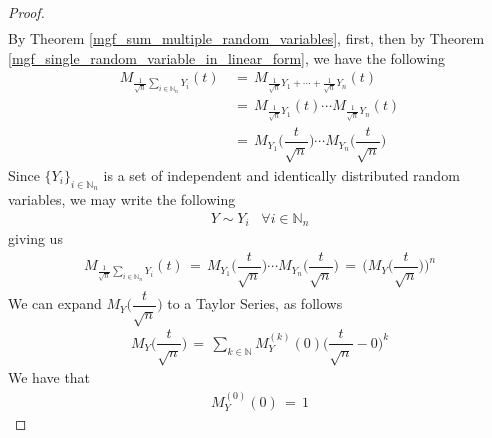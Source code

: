 \begin{theorem}
\begin{proof}
\begin{align*}
        \end{align*}
        By Theorem \ref{mgf_sum_multiple_random_variables}, first, then by Theorem \ref{mgf_single_random_variable_in_linear_form}, we have the following
        \begin{align*}
            M_{\frac{1}{\sqrt{n}}\sum_{i \in \mathbb{N}_{n}}Y_{i}} (t) \hspace{2pt} &= \hspace{2pt} M_{\frac{1}{\sqrt{n}}Y_{1} + \cdots + \frac{1}{\sqrt{n}}Y_{n}} (t) \\[1ex]
            &= \hspace{2pt} M_{\frac{1}{\sqrt{n}}Y_{1}} (t) \cdots M_{\frac{1}{\sqrt{n}}Y_{n}} (t) \\[1ex]
            &= \hspace{2pt} M_{Y_{1}} \Big(\dfrac{t}{\sqrt{n}}\Big) \cdots M_{Y_{n}} \Big(\dfrac{t}{\sqrt{n}}\Big)
        \end{align*}
        Since $\{Y_{i}\}_{i \in \mathbb{N}_{n}}$ is a set of independent and identically distributed random variables, we may write the following
        \begin{align*}
            Y \sim Y_{i} \hspace{10pt} \forall i \in \mathbb{N}_{n} 
        \end{align*}
        giving us
        \begin{align*}
            M_{\frac{1}{\sqrt{n}}\sum_{i \in \mathbb{N}_{n}}Y_{i}} (t) \hspace{2pt} = \hspace{2pt} M_{Y_{1}} \Big(\dfrac{t}{\sqrt{n}}\Big) \cdots M_{Y_{n}} \Big(\dfrac{t}{\sqrt{n}}\Big) \hspace{2pt} = \hspace{2pt} \Big(M_{Y} \Big(\dfrac{t}{\sqrt{n}}\Big) \Big)^{n}
        \end{align*}
        We can expand $M_{Y} \Big(\dfrac{t}{\sqrt{n}}\Big)$ to a Taylor Series, as follows
        \begin{align*}
            M_{Y} \Big(\dfrac{t}{\sqrt{n}}\Big) \hspace{2pt} = \hspace{2pt} \sum_{k \in \mathbb{N}} M_{Y}^{(k)} (0) \Big(\dfrac{t}{\sqrt{n}} - 0\Big)^{k}
        \end{align*}
        We have that 
        \begin{align*}
            M_{Y}^{(0)} (0) \hspace{2pt} = \hspace{2pt} 1
        \end{align*}

\end{proof}
\end{theorem}
